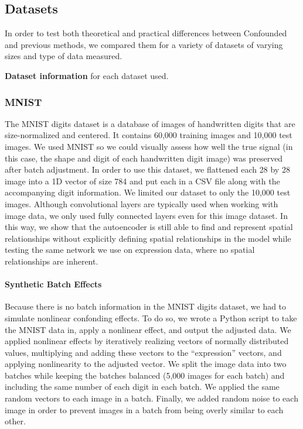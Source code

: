 \documentclass[11pt]{article}
\begin{document}
\subsection{Datasets}

In order to test both theoretical and practical differences between Confounded and previous methods, we compared them for a variety of datasets of varying sizes and type of data measured.

\begin{table}
	\centering
	
	\caption[Dataset information]{
		\textbf{Dataset information} for each dataset used.
	}
	\label{tab:datasets}
\end{table}

\subsubsection{MNIST}

The MNIST digits dataset \cite{lecun_mnist_nodate} is a database of images of handwritten digits that are size-normalized and centered.
It contains 60,000 training images and 10,000 test images.
We used MNIST so we could visually assess how well the true signal (in this case, the shape and digit of each handwritten digit image) was preserved after batch adjustment.
In order to use this dataset, we flattened each 28 by 28 image into a 1D vector of size 784 and put each in a CSV file along with the accompanying digit information.
We limited our dataset to only the 10,000 test images.
Although convolutional layers are typically used when working with image data, we only used fully connected layers even for this image dataset.
In this way, we show that the autoencoder is still able to find and represent spatial relationships without explicitly defining spatial relationships in the model while testing the same network we use on expression data, where no spatial relationships are inherent.

\paragraph{Synthetic Batch Effects}

Because there is no batch information in the MNIST digits dataset, we had to simulate nonlinear confonding effects.
To do so, we wrote a Python script to take the MNIST data in, apply a nonlinear effect, and output the adjusted data.
We applied nonlinear effects by iteratively realizing vectors of normally distributed values, multiplying and adding these vectors to the ``expression'' vectors, and applying nonlinearity to the adjusted vector.
We split the image data into two batches while keeping the batches balanced (5,000 images for each batch) and including the same number of each digit in each batch.
We applied the same random vectors to each image in a batch.
Finally, we added random noise to each image in order to prevent images in a batch from being overly similar to each other.
\end{document}
